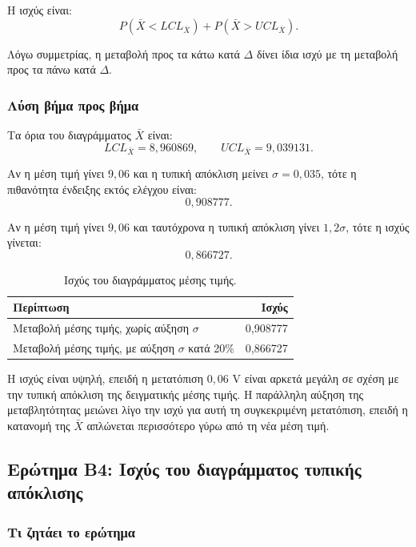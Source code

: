 \documentclass[12pt,a4paper]{article}
\begin{document}
Η ισχύς είναι:
\[
    P(\bar X<LCL_{\bar X})+
    P(\bar X>UCL_{\bar X}).
\]

Λόγω συμμετρίας, η μεταβολή προς τα κάτω κατά \(\Delta\) δίνει ίδια ισχύ με τη
μεταβολή προς τα πάνω κατά \(\Delta\).

\subsubsection*{Λύση βήμα προς βήμα}

Τα όρια του διαγράμματος \(\bar X\) είναι:
\[
    LCL_{\bar X}=8{,}960869,\qquad
    UCL_{\bar X}=9{,}039131.
\]

Αν η μέση τιμή γίνει \(9{,}06\) και η τυπική απόκλιση μείνει \(\sigma=0{,}035\),
τότε η πιθανότητα ένδειξης εκτός ελέγχου είναι:
\[
    \boxed{0{,}908777}.
\]

Αν η μέση τιμή γίνει \(9{,}06\) και ταυτόχρονα η τυπική απόκλιση γίνει
\(1{,}2\sigma\), τότε η ισχύς γίνεται:
\[
    \boxed{0{,}866727}.
\]

\begin{table}[H]
\centering
\caption{Ισχύς του διαγράμματος μέσης τιμής.}
\begin{tabular}{lr}
\toprule
\textbf{Περίπτωση} & \textbf{Ισχύς} \\
\midrule
Μεταβολή μέσης τιμής, χωρίς αύξηση \(\sigma\) & 0,908777 \\
Μεταβολή μέσης τιμής, με αύξηση \(\sigma\) κατά 20\% & 0,866727 \\
\bottomrule
\end{tabular}
\end{table}

Η ισχύς είναι υψηλή, επειδή η μετατόπιση \(0{,}06\) V είναι αρκετά μεγάλη σε
σχέση με την τυπική απόκλιση της δειγματικής μέσης τιμής. Η παράλληλη αύξηση
της μεταβλητότητας μειώνει λίγο την ισχύ για αυτή τη συγκεκριμένη μετατόπιση,
επειδή η κατανομή της \(\bar X\) απλώνεται περισσότερο γύρω από τη νέα μέση
τιμή.

\subsection{Ερώτημα Β4: Ισχύς του διαγράμματος τυπικής απόκλισης}

\subsubsection*{Τι ζητάει το ερώτημα}
\end{document}

